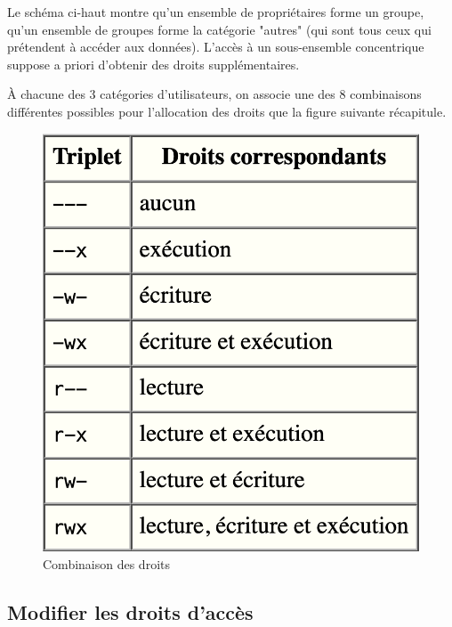 \documentclass{article}
\begin{document}
\begin{exercice}
Le schéma ci-haut montre qu'un ensemble de propriétaires forme un groupe, qu'un ensemble de groupes forme la catégorie "autres" (qui sont tous ceux qui prétendent à accéder aux données).
L'accès à un sous-ensemble concentrique suppose a priori d'obtenir des droits supplémentaires. 

À chacune des 3 catégories d'utilisateurs, on associe une des 8 combinaisons différentes possibles pour l'allocation des droits que la figure suivante récapitule. 

\begin{figure}[h!]
    \begin{center}
    \includegraphics[scale=0.2]{ListeDroits.png}
    \caption{Combinaison des droits}
     \end{center}
\end{figure}    

\newpage

\end{exercice}

\hypertarget{Modifier les droits d'accès}{%
\subsection{Modifier les droits d'accès}\label{Modifier les droits d'accès}}
\end{document}
